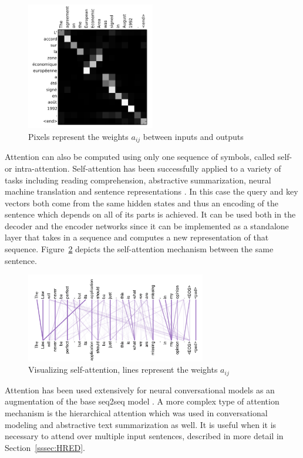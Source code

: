 \documentclass[12pt]{article}
\begin{document}
\begin{figure}[H]
	\centering
	\includegraphics[width=0.5\textwidth]{pics/attn_weights.png}
	\caption{Pixels represent the weights \(a_{ij}\) between inputs and outputs \cite{Bahdanau:2014}}
	\label{fig:attentionb}
\end{figure}
Attention can also be computed using only one sequence of symbols, called self- or intra-attention. Self-attention has been successfully applied to a variety of tasks including reading comprehension, abstractive summarization, neural machine translation and sentence representations \cite{Cheng:2016,Lin:2017,Vaswani:2017,Parikh:2016,Paulus:2017}. In this case the query and key vectors both come from the same hidden states and thus an encoding of the sentence which depends on all of its parts is achieved. It can be used both in the decoder and the encoder networks since it can be implemented as a standalone layer that takes in a sequence and computes a new representation of that sequence. Figure~\ref{fig:attentionc} depicts the self-attention mechanism between the same sentence.

\begin{figure}[H]
	\centering
	\includegraphics[width=0.7\textwidth]{pics/self_attn.png}
	\caption{Visualizing self-attention, lines represent the weights \(a_{ij}\) \cite{Vaswani:2017}}
	\label{fig:attentionc}
\end{figure}
Attention has been used extensively for neural conversational models as an augmentation of the base seq2seq model \cite{Yao:2016,Shang:2015,Xing_topic:2017,Zhao:2017}. A more complex type of attention mechanism is the hierarchical attention which was used in conversational modeling \cite{Xing:2017} and abstractive text summarization \cite{Nallapati:2016} as well. It is useful when it is necessary to attend over multiple input sentences, described in more detail in Section~\ref{sssec:HRED}.
\end{document}

